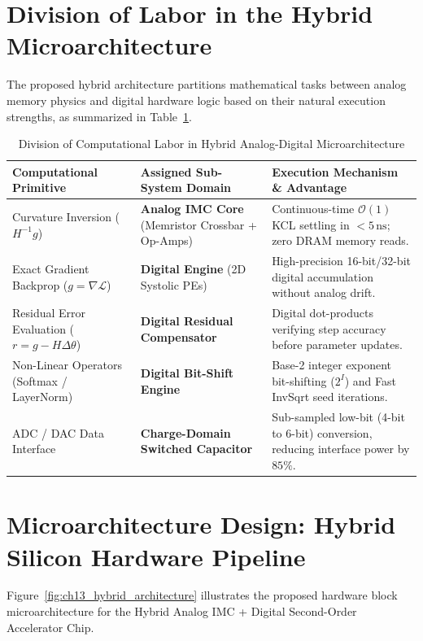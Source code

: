 \section{Division of Labor in the Hybrid Microarchitecture}
The proposed hybrid architecture partitions mathematical tasks between analog memory physics and digital hardware logic based on their natural execution strengths, as summarized in Table~\ref{tab:ch13_division_of_labor}.

\begin{table}[htbp]
\centering
\caption{Division of Computational Labor in Hybrid Analog-Digital Microarchitecture}
\label{tab:ch13_division_of_labor}
\begin{tabularx}{\textwidth}{>{\raggedright\arraybackslash}p{4.0cm} >{\raggedright\arraybackslash}X >{\raggedright\arraybackslash}p{4.2cm}}
\toprule
\textbf{Computational Primitive} & \textbf{Assigned Sub-System Domain} & \textbf{Execution Mechanism \& Advantage} \\
\midrule
Curvature Inversion ($H^{-1} g$) & \textbf{Analog IMC Core} (Memristor Crossbar + Op-Amps) & Continuous-time $\mathcal{O}(1)$ KCL settling in $<5\,\text{ns}$; zero DRAM memory reads. \\
Exact Gradient Backprop ($g = \nabla \mathcal{L}$) & \textbf{Digital Engine} (2D Systolic PEs) & High-precision 16-bit/32-bit digital accumulation without analog drift. \\
Residual Error Evaluation ($r = g - H \Delta \theta$) & \textbf{Digital Residual Compensator} & Digital dot-products verifying step accuracy before parameter updates. \\
Non-Linear Operators (Softmax / LayerNorm) & \textbf{Digital Bit-Shift Engine} & Base-2 integer exponent bit-shifting ($2^I$) and Fast InvSqrt seed iterations. \\
ADC / DAC Data Interface & \textbf{Charge-Domain Switched Capacitor} & Sub-sampled low-bit (4-bit to 6-bit) conversion, reducing interface power by $85\%$. \\
\bottomrule
\end{tabularx}
\end{table}


\section{Microarchitecture Design: Hybrid Silicon Hardware Pipeline}
Figure~\ref{fig:ch13_hybrid_architecture} illustrates the proposed hardware block microarchitecture for the Hybrid Analog IMC + Digital Second-Order Accelerator Chip.

